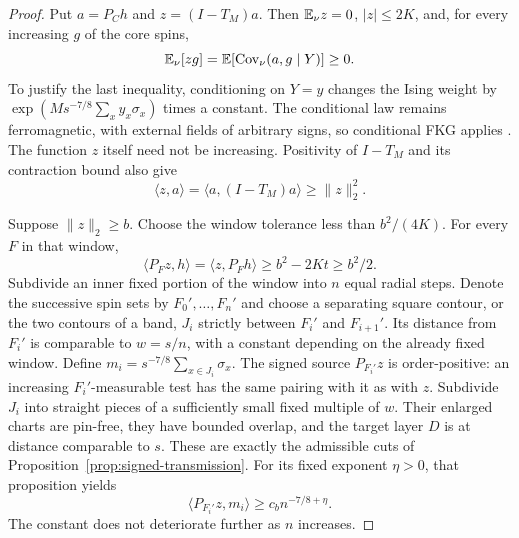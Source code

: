 \begin{proof}
Put $a=P_Ch$ and $z=(I-T_M)a$.  Then $\mathbb E_\nu z=0$, $|z|\leq2K$,
and, for every increasing $g$ of the core spins,
\begin{equation}
 \mathbb E_\nu[zg]=\mathbb E[\operatorname{Cov}_\nu(a,g\mid Y)]\geq0.
 \label{eq:transfer-order-positive}
\end{equation}
To justify the last inequality, conditioning on $Y=y$ changes the Ising
weight by $\exp(Ms^{-7/8}\sum_x y_x\sigma_x)$ times a constant.
The conditional law remains ferromagnetic, with external fields of
arbitrary signs, so conditional FKG applies
\citep[Proposition~1 and pp.~98--99]{FKG1971}.  The function $z$ itself
need not be increasing.  Positivity of $I-T_M$ and its contraction bound
also give
\begin{equation}
 \langle z,a\rangle
 =\langle a,(I-T_M)a\rangle\geq\|z\|_2^2.
 \label{eq:transfer-residual-energy}
\end{equation}

Suppose $\|z\|_2\geq b$.  Choose the window tolerance less than
$b^2/(4K)$.  For every $F$ in that window,
\[
 \langle P_Fz,h\rangle=\langle z,P_Fh\rangle
 \geq b^2-2Kt\geq b^2/2.
\]
Subdivide an inner fixed portion of the window into $n$ equal radial
steps.  Denote the successive spin sets by $F_0',\ldots,F_n'$ and choose
a separating square contour, or the two contours of a band, $J_i$
strictly between $F_i'$ and $F_{i+1}'$.  Its distance from $F_i'$ is
comparable to $w=s/n$, with a constant depending on the already fixed
window.  Define $m_i=s^{-7/8}\sum_{x\in J_i}\sigma_x$.
The signed source $P_{F_i'}z$ is order-positive: an increasing
$F_i'$-measurable test has the same pairing with it as with $z$.
Subdivide $J_i$ into straight pieces of a sufficiently small fixed
multiple of $w$.  Their enlarged charts are pin-free, they have bounded
overlap, and the target layer $D$ is at distance comparable to $s$.
These are exactly the admissible cuts of
Proposition~\ref{prop:signed-transmission}.  For its fixed exponent
$\eta>0$, that proposition yields
\begin{equation}
 \langle P_{F_i'}z,m_i\rangle\geq c_b n^{-7/8+\eta}.
 \label{eq:transfer-transmission-lower}
\end{equation}
The constant does not deteriorate further as $n$ increases.


\end{proof}
